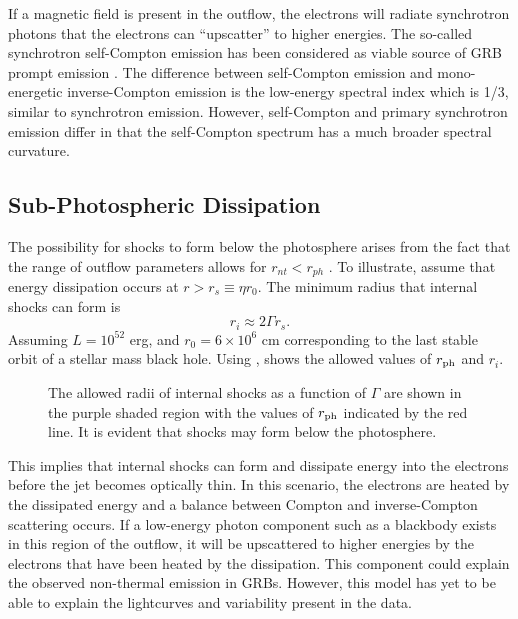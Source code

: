 If a magnetic field is present in the outflow, the electrons will
radiate synchrotron photons that the electrons can ``upscatter'' to
higher energies. The so-called synchrotron self-Compton emission has
been considered as viable source of GRB prompt emission
\cite{Freedman:2001,Spada:2000}. The difference between self-Compton
emission and mono-energetic inverse-Compton emission is the low-energy
spectral index which is 1/3, similar to synchrotron emission. However,
self-Compton and primary synchrotron emission differ in that the self-Compton spectrum has a much broader spectral curvature.


\subsection{Sub-Photospheric Dissipation}
\label{sec:subpht}
The possibility for shocks to form below the photosphere arises from
the fact that the range of outflow parameters allows for
$r_{nt}<r_{ph}$ \cite{Peer:2005}. To illustrate, assume that energy
dissipation occurs at $r>r_s \equiv \eta r_0$. The minimum radius that internal shocks can form is
\begin{equation}
\label{eq:ri}
r_i\approx 2\Gamma r_s.
\end{equation}
Assuming $L=10^{52}$ erg, and $r_0 = 6\times10^{6}$ cm corresponding
to the last stable orbit of a stellar mass black hole. Using
,  shows the allowed
values of $r_{\rm ph}$ and $r_i$.
\begin{figure}[t]
  \centering
  
  
  \caption{The allowed radii of internal shocks as a function of
    $\Gamma$ are shown in the purple shaded region with the values of
    $r_{\rm ph}$ indicated by the red line. It is evident that shocks
    may form below the photosphere.}
\label{fig:subph}
\end{figure}
This implies that internal shocks can form and dissipate energy into
the electrons before the jet becomes optically thin. In this scenario,
the electrons are heated by the dissipated energy and a balance
between Compton and inverse-Compton scattering occurs. If a low-energy
photon component such as a blackbody exists in this region of the
outflow, it will be upscattered to higher energies by the electrons
that have been heated by the dissipation. This component could explain
the observed non-thermal emission in GRBs. However, this model has yet
to be able to explain the lightcurves and variability present in the
data.




